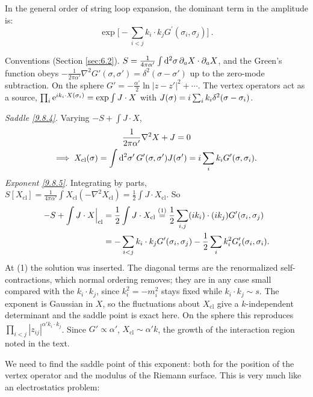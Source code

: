 In the general order of string loop expansion, the dominant term in the amplitude is:
\begin{equation}
	\exp \Biggl[-\sum_{i<j} k_{i} \cdot k_{j} G^{\prime}(\sigma_{i}, \sigma_{j})\Biggr] \:.
	\label{9.8.5}
\end{equation}
\begin{tcolorbox}[breakable]
	\begin{remark}
		Conventions (Section \ref{sec:6.2}). $S=\frac{1}{4\pi\alpha'}\int\mathrm{d}^2\sigma\,\partial_aX\cdot\partial_aX$, and the Green's function obeys $-\frac{1}{2\pi\alpha'}\nabla^2G'(\sigma,\sigma')=\delta^2(\sigma-\sigma')$ up to the zero-mode subtraction. On the sphere $G'=-\frac{\alpha'}{2}\ln|z-z'|^2+\cdots$. The vertex operators act as a source, $\prod_i\mathrm{e}^{i k_i\cdot X(\sigma_i)}=\exp\int J\cdot X$ with $J(\sigma)=i\sum_ik_i\delta^2(\sigma-\sigma_i)$.

		\emph{Saddle \eqref{9.8.4}.} Varying $-S+\int J\cdot X$,
		\begin{gather*}
			\frac{1}{2\pi\alpha'}\nabla^2X+J=0\\
			\Longrightarrow\;X_{\mathrm{cl}}(\sigma)=\int\mathrm{d}^2\sigma'\,G'(\sigma,\sigma')J(\sigma')=i\sum_ik_iG'(\sigma,\sigma_i) .
		\end{gather*}
		\emph{Exponent \eqref{9.8.5}.} Integrating by parts, $S[X_{\mathrm{cl}}]=\frac{1}{4\pi\alpha'}\int X_{\mathrm{cl}}(-\nabla^2X_{\mathrm{cl}})=\frac12\int J\cdot X_{\mathrm{cl}}$. So
		\begin{align*}
			-S+\int J\cdot X\Bigr|_{\mathrm{cl}}&=\frac12\int J\cdot X_{\mathrm{cl}}\overset{(1)}{=}\frac12\sum_{i,j}(i k_i)\cdot(i k_j)G'(\sigma_i,\sigma_j)\\
			&=-\sum_{i<j}k_i\cdot k_jG'(\sigma_i,\sigma_j)-\frac12\sum_ik_i^2G'_{\mathrm r}(\sigma_i,\sigma_i) .
		\end{align*}
		At (1) the solution was inserted. The diagonal terms are the renormalized self-contractions, which normal ordering removes; they are in any case small compared with the $k_i\cdot k_j$, since $k_i^2=-m_i^2$ stays fixed while $k_i\cdot k_j\sim s$. The exponent is Gaussian in $X$, so the fluctuations about $X_{\mathrm{cl}}$ give a $k$-independent determinant and the saddle point is exact here. On the sphere this reproduces $\prod_{i<j}|z_{ij}|^{\alpha'k_i\cdot k_j}$. Since $G'\propto\alpha'$, $X_{\mathrm{cl}}\sim\alpha'k$, the growth of the interaction region noted in the text.
	\end{remark}
\end{tcolorbox}
We need to find the saddle point of this exponent: both for the position of the vertex operator and the modulus of the Riemann surface. This is very much like an electrostatics problem: 
